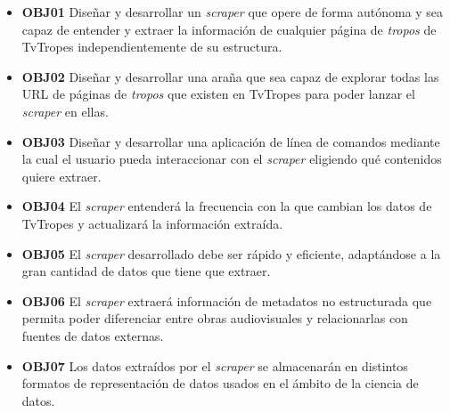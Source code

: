 \begin{itemize}
    \item \textbf{OBJ01} Diseñar y desarrollar un \textit{scraper} que opere de
    forma autónoma y sea capaz de entender y extraer la información de cualquier
    página de \textit{tropos} de TvTropes independientemente de su estructura.
    \item \textbf{OBJ02} Diseñar y desarrollar una araña que sea capaz de
    explorar todas las URL de páginas de \textit{tropos} que existen en TvTropes
    para poder lanzar el \textit{scraper} en ellas.
    \item \textbf{OBJ03} Diseñar y desarrollar una aplicación de línea de
    comandos mediante la cual el usuario pueda interaccionar con el
    \textit{scraper} eligiendo qué contenidos quiere extraer.
    \item \textbf{OBJ04} El \textit{scraper} entenderá la frecuencia con la que
    cambian los datos de TvTropes y actualizará la información extraída.
    \item \textbf{OBJ05} El \textit{scraper} desarrollado debe ser rápido y
    eficiente, adaptándose a la gran cantidad de datos que tiene que extraer.
    \item \textbf{OBJ06} El \textit{scraper} extraerá información de metadatos
    no estructurada que permita poder diferenciar entre obras audiovisuales y
    relacionarlas con fuentes de datos externas.
    \item \textbf{OBJ07} Los datos extraídos por el \textit{scraper} se
    almacenarán en distintos formatos de representación de datos usados en el
    ámbito de la ciencia de datos.
\end{itemize}


